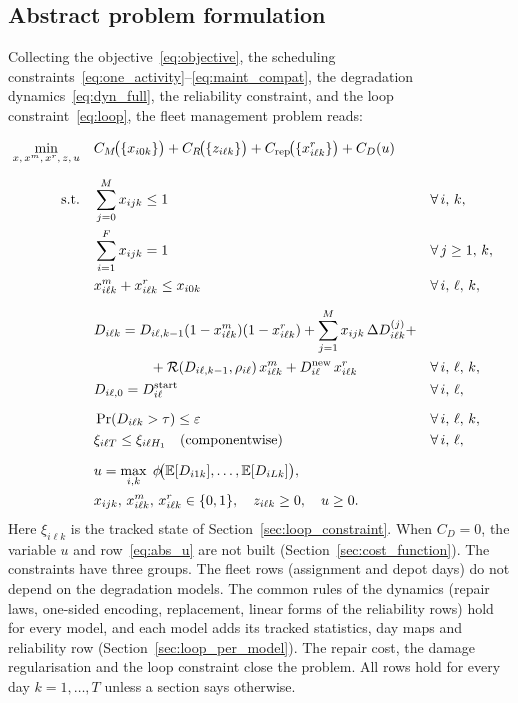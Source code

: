 \documentclass[11pt,a4paper]{article}
\theoremstyle{plain}
\theoremstyle{definition}
\theoremstyle{remark}
\begin{document}
\subsection{Abstract problem formulation}

Collecting the objective~\eqref{eq:objective}, the scheduling constraints~\eqref{eq:one_activity}--\eqref{eq:maint_compat}, the degradation dynamics~\eqref{eq:dyn_full}, the reliability constraint, and the loop constraint~\eqref{eq:loop}, the fleet management problem reads:

\begin{subequations}\label{eq:abstract}
\begin{align}
\min_{x,\,x^m,\,x^r,\,z,\,u} \quad
  & C_M\!\bigl(\{x_{i0k}\}\bigr)
    + C_R\!\bigl(\{z_{i\ell k}\}\bigr)
    + C_{\mathrm{rep}}\!\bigl(\{x^r_{i\ell k}\}\bigr)
    + C_D(u)
    \label{eq:abs_obj} \\[6pt]
%
\text{s.t.} \quad
  & \sum_{j=0}^{M} x_{ijk} \le 1
    && \forall\, i,\,k,
    \label{eq:abs_assign} \\
  & \sum_{i=1}^{F} x_{ijk} = 1
    && \forall\, j \ge 1,\,k,
    \label{eq:abs_cover} \\
  & x^m_{i\ell k} + x^r_{i\ell k} \le x_{i0k}
    && \forall\, i,\,\ell,\,k,
    \label{eq:abs_maint} \\[6pt]
%
  & D_{i\ell k} = D_{i\ell,k-1}(1-x^m_{i\ell k})(1-x^r_{i\ell k})
    + \sum_{j=1}^{M} x_{ijk}\,\Delta D_{i\ell k}^{(j)} + \notag \\
  & \qquad\qquad + \mathcal{R}(D_{i\ell,k-1},\rho_{i\ell})\,x^m_{i\ell k}
    + D^{\mathrm{new}}_{i\ell}\,x^r_{i\ell k}
    && \forall\, i,\,\ell,\,k,
    \label{eq:abs_dyn} \\
  & D_{i\ell,0} = D^{\mathrm{start}}_{i\ell}
    && \forall\, i,\,\ell,
    \label{eq:abs_init} \\[6pt]
%
  & \Pr(D_{i\ell k} > \tau) \le \varepsilon
    && \forall\, i,\,\ell,\,k,
    \label{eq:abs_rel} \\
  & \xi_{i\ell T} \le \xi_{i\ell H_1} \quad \text{(componentwise)}
    && \forall\, i,\,\ell,
    \label{eq:abs_loop} \\[6pt]
%
  & u = \max_{i,k}\;\phi\!\bigl(\mathbb{E}[D_{i1k}],\ldots,\mathbb{E}[D_{iLk}]\bigr),
    \label{eq:abs_u} \\
  & x_{ijk},\, x^m_{i\ell k},\, x^r_{i\ell k} \in \{0,1\},\quad
    z_{i\ell k} \ge 0,\quad u \ge 0.
    \label{eq:abs_domain}
\end{align}
\end{subequations}
Here $\xi_{i\ell k}$ is the tracked state of Section~\ref{sec:loop_constraint}.
When $C_D = 0$, the variable $u$ and row~\eqref{eq:abs_u} are not built (Section~\ref{sec:cost_function}).
The constraints have three groups.
The fleet rows (assignment and depot days) do not depend on the degradation models.
The common rules of the dynamics (repair laws, one-sided encoding, replacement, linear forms of the reliability rows) hold for every model, and each model adds its tracked statistics, day maps and reliability row (Section~\ref{sec:loop_per_model}).
The repair cost, the damage regularisation and the loop constraint close the problem.
All rows hold for every day $k = 1, \ldots, T$ unless a section says otherwise.
\end{document}
